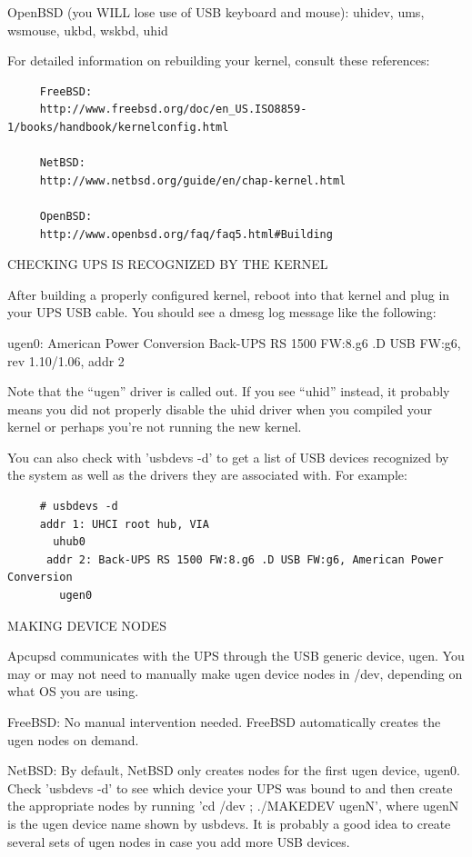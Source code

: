 OpenBSD (you WILL lose use of USB keyboard and mouse):  uhidev, ums, wsmouse,
ukbd, wskbd, uhid  

For detailed information on rebuilding your kernel, consult these references: 

\footnotesize
\begin{verbatim}
     FreeBSD:
     http://www.freebsd.org/doc/en_US.ISO8859-1/books/handbook/kernelconfig.html
     
     NetBSD:
     http://www.netbsd.org/guide/en/chap-kernel.html
     
     OpenBSD:
     http://www.openbsd.org/faq/faq5.html#Building
\end{verbatim}
\normalsize

CHECKING UPS IS RECOGNIZED BY THE KERNEL  

After building a properly configured kernel, reboot into that kernel and plug
in your UPS USB cable. You should see a dmesg log message like the following: 


ugen0: American Power Conversion Back-UPS RS 1500 FW:8.g6 .D USB FW:g6, rev
1.10/1.06, addr 2  

Note that the ``ugen'' driver is called out. If you see ``uhid'' instead, it
probably means you did not properly disable the uhid driver when you compiled
your kernel or perhaps you're not running the new kernel.  

You can also check with 'usbdevs -d' to get a list of USB devices recognized
by the system as well as the drivers they are associated with. For example: 

\footnotesize
\begin{verbatim}
     # usbdevs -d
     addr 1: UHCI root hub, VIA
       uhub0
      addr 2: Back-UPS RS 1500 FW:8.g6 .D USB FW:g6, American Power Conversion
        ugen0
\end{verbatim}
\normalsize

MAKING DEVICE NODES  

Apcupsd communicates with the UPS through the USB generic device, ugen. You
may or may not need to manually make ugen device nodes in /dev, depending on
what OS you are using.  

FreeBSD: No manual intervention needed. FreeBSD automatically creates the ugen
nodes on demand.  

NetBSD: By default, NetBSD only creates nodes for the first ugen device,
ugen0. Check 'usbdevs -d' to see which device your UPS was bound to and then
create the appropriate nodes by running 'cd /dev ; ./MAKEDEV ugenN', where
ugenN is the ugen device name shown by usbdevs. It is probably a good idea to
create several sets of ugen nodes in case you add more USB devices.  


